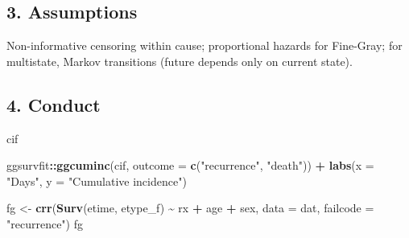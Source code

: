 \documentclass[
]{article}
\newenvironment{Shaded}{\begin{snugshade}}{\end{snugshade}}
\newcommand{\AttributeTok}[1]{\textcolor[rgb]{0.13,0.29,0.53}{#1}}
\newcommand{\FunctionTok}[1]{\textcolor[rgb]{0.13,0.29,0.53}{\textbf{#1}}}
\newcommand{\NormalTok}[1]{#1}
\newcommand{\OtherTok}[1]{\textcolor[rgb]{0.56,0.35,0.01}{#1}}
\newcommand{\SpecialCharTok}[1]{\textcolor[rgb]{0.81,0.36,0.00}{\textbf{#1}}}
\newcommand{\StringTok}[1]{\textcolor[rgb]{0.31,0.60,0.02}{#1}}
\begin{document}
\subsection{3. Assumptions}\label{assumptions}

Non-informative censoring within cause; proportional hazards for
Fine-Gray; for multistate, Markov transitions (future depends only on
current state).

\subsection{4. Conduct}\label{conduct}

\begin{Shaded}
\begin{Highlighting}[]
\NormalTok{cif}
\end{Highlighting}
\end{Shaded}

\begin{Shaded}
\begin{Highlighting}[]
\NormalTok{ggsurvfit}\SpecialCharTok{::}\FunctionTok{ggcuminc}\NormalTok{(cif, }\AttributeTok{outcome =} \FunctionTok{c}\NormalTok{(}\StringTok{"recurrence"}\NormalTok{, }\StringTok{"death"}\NormalTok{)) }\SpecialCharTok{+}
  \FunctionTok{labs}\NormalTok{(}\AttributeTok{x =} \StringTok{"Days"}\NormalTok{, }\AttributeTok{y =} \StringTok{"Cumulative incidence"}\NormalTok{)}
\end{Highlighting}
\end{Shaded}

\begin{Shaded}
\begin{Highlighting}[]
\NormalTok{fg }\OtherTok{\textless{}{-}} \FunctionTok{crr}\NormalTok{(}\FunctionTok{Surv}\NormalTok{(etime, etype\_f) }\SpecialCharTok{\textasciitilde{}}\NormalTok{ rx }\SpecialCharTok{+}\NormalTok{ age }\SpecialCharTok{+}\NormalTok{ sex, }\AttributeTok{data =}\NormalTok{ dat,}
          \AttributeTok{failcode =} \StringTok{"recurrence"}\NormalTok{)}
\NormalTok{fg}
\end{Highlighting}
\end{Shaded}
\end{document}
